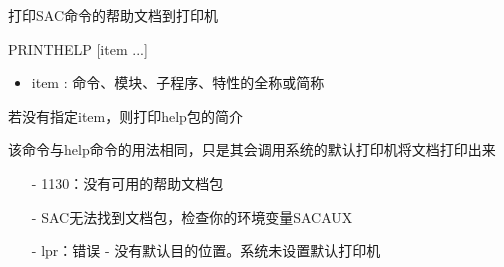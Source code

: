 \label{cmd:printhelp}

打印SAC命令的帮助文档到打印机

\begin{SACSTX}
PRINTHELP [item ...]
\end{SACSTX}

\begin{itemize}
\item item : 命令、模块、子程序、特性的全称或简称
\end{itemize}

若没有指定item，则打印help包的简介

该命令与help命令的用法相同，只是其会调用系统的默认打印机将文档打印出来

\begin{itemize}
\item[-]1130：没有可用的帮助文档包
\item[-]SAC无法找到文档包，检查你的环境变量SACAUX	
\item[-]lpr：错误 - 没有默认目的位置。系统未设置默认打印机
\end{itemize}
